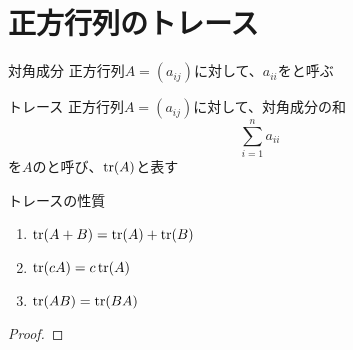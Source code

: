 \documentclass[../../../topic_linear-algebra]{subfiles}
\begin{document}
\sectionline
\section{正方行列のトレース}

\begin{definition}{対角成分}
  正方行列$A = (a_{ij})$に対して、$a_{ii}$をと呼ぶ
\end{definition}

\begin{definition}{トレース}\label{def:trace}
  正方行列$A=(a_{ij})$に対して、対角成分の和
  \begin{equation*}
    \sum_{i=1}^n a_{ii}
  \end{equation*}
  を$A$のと呼び、$\tr(A)$と表す
\end{definition}

\begin{theorem}{トレースの性質}
  \begin{enumerate}[label=\romanlabel]
    \item $\tr(A+B) = \tr(A) + \tr(B)$
    \item $\tr(cA) = c\tr(A)$
    \item $\tr(AB) = \tr(BA)$
  \end{enumerate}
\end{theorem}

\begin{proof}
\end{proof}
\end{document}
